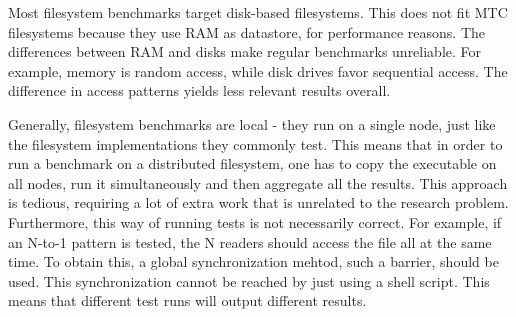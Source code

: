 Most filesystem benchmarks target disk-based filesystems. This does not fit MTC filesystems because they use RAM as datastore, for performance reasons. The differences between RAM and disks make regular benchmarks unreliable. For example, memory is random access, while disk drives favor sequential access. The difference in access patterns yields less relevant results overall.

Generally, filesystem benchmarks are local - they run on a single node, just like the filesystem implementations they commonly test. This means that in order to run a benchmark on a distributed filesystem, one has to copy the executable on all nodes, run it simultaneously and then aggregate all the results. This approach is tedious, requiring a lot of extra work that is unrelated to the research problem. Furthermore, this way of running tests is not necessarily correct. For example, if an N-to-1 pattern is tested, the N readers should access the file all at the same time. To obtain this, a global synchronization mehtod, such a barrier, should be used. This synchronization cannot be reached by just using a shell script. This means that different test runs will output different results.
